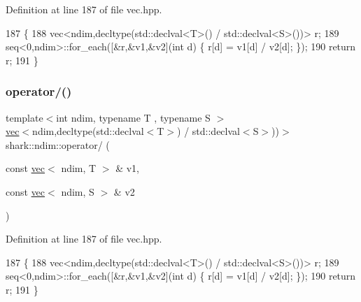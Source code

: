 Definition at line 187 of file vec.\+hpp.


\begin{DoxyCode}
187                                                                                                            
                        \{
188             vec<ndim,decltype(std::declval<T>() / std::declval<S>())> r;
189             seq<0,ndim>::for\_each([&r,&v1,&v2](\textcolor{keywordtype}{int} d) \{ r[d] = v1[d] / v2[d]; \});
190             \textcolor{keywordflow}{return} r;
191         \}
\end{DoxyCode}
\hypertarget{namespaceshark_1_1ndim_a6dc727bc15068ffca49ca1675cbe6c2b}{}\label{namespaceshark_1_1ndim_a6dc727bc15068ffca49ca1675cbe6c2b} 
\subsubsection{\texorpdfstring{operator/()}{operator/()}\hspace{0.1cm}{\footnotesize\ttfamily [2/5]}}
{\footnotesize\ttfamily template$<$int ndim, typename T , typename S $>$ \\
\hyperlink{structshark_1_1ndim_1_1vec}{vec}$<$ndim,decltype(std\+::declval$<$T$>$) / std\+::declval$<$S$>$))$>$ shark\+::ndim\+::operator/ (\begin{DoxyParamCaption}\item[{const \hyperlink{structshark_1_1ndim_1_1vec}{vec}$<$ ndim, T $>$ \&}]{v1,  }\item[{const \hyperlink{structshark_1_1ndim_1_1vec}{vec}$<$ ndim, S $>$ \&}]{v2 }\end{DoxyParamCaption})\hspace{0.3cm}{\ttfamily [inline]}}



Definition at line 187 of file vec.\+hpp.


\begin{DoxyCode}
187                                                                                                            
                        \{
188             vec<ndim,decltype(std::declval<T>() / std::declval<S>())> r;
189             seq<0,ndim>::for\_each([&r,&v1,&v2](\textcolor{keywordtype}{int} d) \{ r[d] = v1[d] / v2[d]; \});
190             \textcolor{keywordflow}{return} r;
191         \}
\end{DoxyCode}
\hypertarget{namespaceshark_1_1ndim_a2cb8f6e837e4b1d3d8b8b56ced78b745}{}\label{namespaceshark_1_1ndim_a2cb8f6e837e4b1d3d8b8b56ced78b745} 
